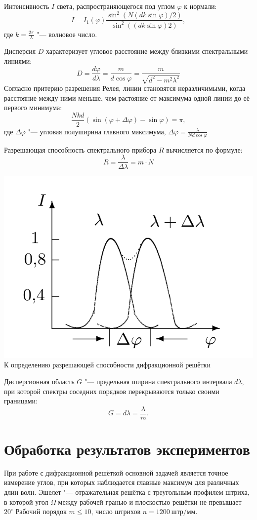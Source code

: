 \documentclass[a4paper,12pt]{article}
\begin{document}
 Интенсивность $I$ света, распространяющегося под углом $\varphi$ к нормали:
 \[
 I = I_1(\varphi)\frac{\sin^2 (N(dk \sin \varphi) / 2)}{\sin^2 ((dk \sin \varphi) 2)},
 \]
 где $k = \frac{2 \pi}{\lambda}$ "--- волновое число.

 Дисперсия $D$ характеризует угловое расстояние между близкими спектральными линиями:
 \[
 D = \frac{d \varphi}{d \lambda} = \frac{m}{d \cos \varphi} = \frac{m}{\sqrt{d^2 - m^2 \lambda^2}}
 \]
 Согласно притерию разрешения Релея, линии становятся неразличимыми, когда расстояние между ними меньше, чем растояние от максимума одной линии до её первого минимума:
 \[
    \frac{Nkd}{2}(\sin (\varphi + \Delta \varphi) - \sin \varphi) = \pi,
 \]
 где $\Delta \varphi$ "--- угловая полуширина главного максимума, $\Delta \varphi = \frac{\lambda}{Nd \cos \varphi}$


 Разрешающая способность спектрального прибора $R$ вычисляется по формуле:
 \[
 R = \frac{\lambda}{\Delta \lambda} = m \cdot N
 \]
\begin{center}
    \includegraphics[width = 1.0\linewidth]{k.png}
    {К определению разрешающей способности дифракционной решётки}
\end{center}
Дисперсионная область $G$ "--- предельная ширина спектрального интервала $d \lambda$, при которой спектры соседних порядков перекрываются только своими границами:
\[
G = d \lambda = \frac{\lambda}{m}.
\]

\section*{Обработка результатов экспериментов}
При работе с дифракционной решёткой основной задачей является точное измерение углов, при которых наблюдается главные максимум для различных длин волн.
Эшелет "--- отражательная решётка с  треугольным профилем штриха, в которой угол $\Omega$ между рабочей гранью и плоскостью решётки не превышает $20^\circ$
Рабочий порядок $m \leq 10$, число штрихов $n = 1200\ штр/мм$.
\end{document}
